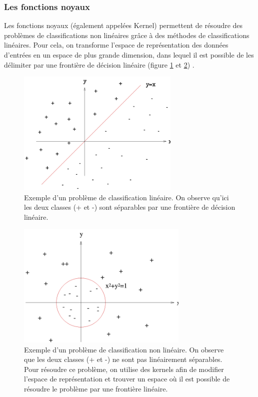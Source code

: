 \subsubsection{Les fonctions noyaux}
\label{Le Machine Learning: Les différents algorithmes: SVM: les fonctions noyaux}
Les fonctions noyaux (également appelées Kernel) permettent de résoudre des problèmes de classifications non linéaires grâce à des méthodes de classifications linéaires. Pour cela, on transforme l'espace de représentation des données d'entrées en un espace de plus grande dimension, dans lequel il est possible de les délimiter par une frontière de décision linéaire (figure \ref{fig:Svm: Exemple d'un problème de classification linéaire} et \ref{fig:Svm: Exemple d'un problème de classification non linéaire}) .

\begin{figure}[h]
	\centering\includegraphics[height=6cm]{images/svm_regression.png}
	\caption[Exemple d'un problème de classification linéaire]{Exemple d'un problème de classification linéaire. On observe qu'ici les deux classes (+ et -) sont séparables par une frontière de décision linéaire. }
	\label{fig:Svm: Exemple d'un problème de classification linéaire}
\end{figure}

\begin{figure}[h]
	\centering\includegraphics[height=6cm]{images/svm_cercle.png}
	\caption[Exemple d'un problème de classification non linéaire]{Exemple d'un problème de classification non linéaire. On observe que les deux classes (+ et -) ne sont pas linéairement séparables. Pour résoudre ce problème, on utilise des kernels afin de modifier l'espace de représentation et trouver un espace où il est possible de résoudre le problème par une frontière linéaire.}
	\label{fig:Svm: Exemple d'un problème de classification non linéaire}
\end{figure}

